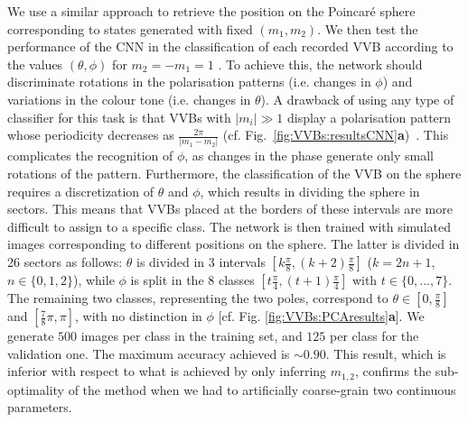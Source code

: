 We use a similar approach to retrieve the position on the Poincar\'e sphere corresponding to states generated with fixed $(m_1,m_2)$.
We then test the performance of the CNN in the classification of each recorded VVB according to the values $(\theta,\phi)$ for $m_2=-m_1=1$ .
To  achieve this, the network should discriminate rotations in the polarisation patterns (i.e. changes in $\phi$) and variations in the colour tone (i.e. changes in $\theta$).  A drawback of using  any type of classifier for this task is that VVBs with $|m_i|\gg1$ display a polarisation pattern whose periodicity decreases as $\frac{2\pi}{|m_1-m_2|}$ (cf. Fig.~\mbox{\ref{fig:VVBs:resultsCNN}}{\bf a})~\cite{fickler2012quantum,dambrosio2013photonic}.
This complicates the recognition of $\phi$, as changes in the phase generate only small rotations of the pattern.
Furthermore, the classification of the VVB on the sphere requires a discretization of  $\theta$ and $\phi$, which results in dividing the sphere in sectors. This means that VVBs placed at the borders of these intervals are more difficult to assign to a specific class.
The network is then trained with  simulated images  corresponding to different positions on the sphere. 
The latter is divided in 26 sectors as follows: $\theta$ is divided in $3$ intervals $\left[k \frac{\pi}{8}, (k+2) \frac{\pi}{8}\right]$ ($k=2n+1$,  $n \in \{0,1,2\}$), while $\phi$ is split in the 8 classes $\left[t \frac{\pi}{4}, (t+1) \frac{\pi}{4}\right]$ with $t \in \{0,...,7\} $. The remaining two classes, representing the two poles, correspond to $\theta \in \left[0, \frac{\pi}{8}\right]$ and $ \left[ \frac{7}{8} \pi, \pi\right]$, with no distinction in $\phi$ [cf. Fig. \ref{fig:VVBs:PCAresults}{\bf a}].
We  generate $500$ images per class in the training set, and $125$ per class  for the  validation one. The maximum accuracy  achieved is $\sim 0.90$. This result, which is inferior with respect to what is achieved by only inferring $m_{1,2}$,  confirms the sub-optimality of the method when we had to artificially coarse-grain two continuous parameters.  

